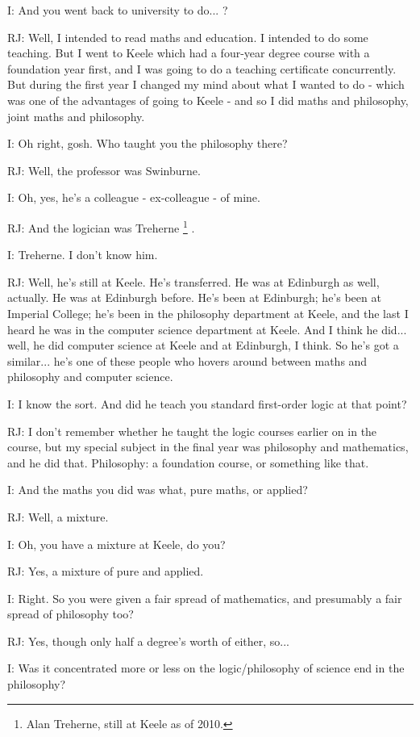 \documentclass[10pt,titlepage]{book}
\begin{document}
I: And you went back to university to do... ?

RJ: Well, I intended to read maths and education.
I intended to do some teaching.
But I went to Keele which had a four-year degree course with a foundation year first, and I was going to do a teaching certificate concurrently.
But during the first year I changed my mind about what I wanted to do - which was one of the advantages of going to Keele - and so I did maths and philosophy, joint maths and philosophy.

I: Oh right, gosh. Who taught you the philosophy there?

RJ: Well, the professor was Swinburne.

I: Oh, yes, he's a colleague - ex-colleague - of mine.

RJ: And the logician was Treherne%
\footnote{
Alan Treherne, still at Keele as of 2010.}%
.

I: Treherne. I don't know him.

RJ: Well, he's still at Keele. He's transferred. He was at Edinburgh as well, actually. He was at Edinburgh before. He's been at Edinburgh; he's been at Imperial College; he's been in the philosophy department at Keele, and the last I heard he was in the computer science department at Keele. And I think he did... well, he did computer science at Keele and at Edinburgh, I think. So he's got a similar... he's one of these people who hovers around between maths and philosophy and computer science.

I: I know the sort. And did he teach you standard first-order logic at that point?

RJ: I don't remember whether he taught the logic courses earlier on in the course, but my special subject in the final year was philosophy and mathematics, and he did that. Philosophy: a foundation course, or something like that.

I: And the maths you did was what, pure maths, or applied?

RJ: Well, a mixture.

I: Oh, you have a mixture at Keele, do you?

RJ: Yes, a mixture of pure and applied.

I: Right. So you were given a fair spread of mathematics, and presumably a fair spread of philosophy too?

RJ: Yes, though only half a degree's worth of either, so...

I: Was it concentrated more or less on the logic/philosophy of science end in the philosophy?
\end{document}
